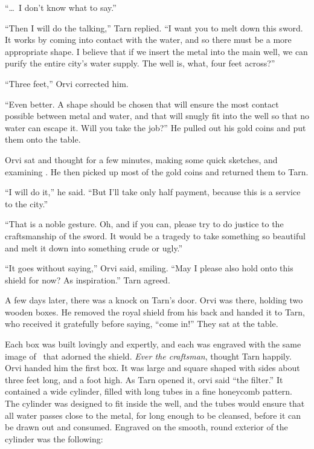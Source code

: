 ``\ldots\ I don't know what to say.''

``Then I will do the talking,'' Tarn replied.  ``I want you to melt down this sword.  It works by coming into contact with the water, and so there must be a more appropriate shape.  I believe that if we insert the metal into the main well, we can purify the entire city's water supply.  The well is, what, four feet across?''

``Three feet,'' Orvi corrected him.

``Even better.  A shape should be chosen that will ensure the most contact possible between metal and water, and that will snugly fit into the well so that no water can escape it.  Will you take the job?''  He pulled out his gold coins and put them onto the table.

Orvi sat and thought for a few minutes, making some quick sket\-ches, and examining \kildir.  He then picked up most of the gold coins and returned them to Tarn.

``I will do it,'' he said.  ``But I'll take only half payment, because this is a service to the city.''

``That is a noble gesture.  Oh, and if you can, please try to do justice to the craftsmanship of the sword.  It would be a tragedy to take something so beautiful and melt it down into something crude or ugly.''

``It goes without saying,'' Orvi said, smiling.  ``May I please also hold onto this shield for now?  As inspiration.''  Tarn agreed.

\divider

A few days later, there was a knock on Tarn's door.  Orvi was there, holding two wooden boxes.  He removed the royal shield from his back and handed it to Tarn, who received it gratefully before saying, ``come in!''  They sat at the table.

Each box was built lovingly and expertly, and each was engraved with the same image of \valdunmir\ that adorned the shield.  \emph{Ever the craftsman}, thought Tarn happily.  Orvi handed him the first box.  It was large and square shaped with sides about three feet long, and a foot high.  As Tarn opened it, orvi said ``the filter.''  It contained a wide cylinder, filled with long tubes in a fine honeycomb pattern.  The cylinder was designed to fit inside the well, and the tubes would ensure that all water passes close to the metal, for long enough to be cleansed, before it can be drawn out and consumed.  Engraved on the smooth, round exterior of the cylinder was the following:

